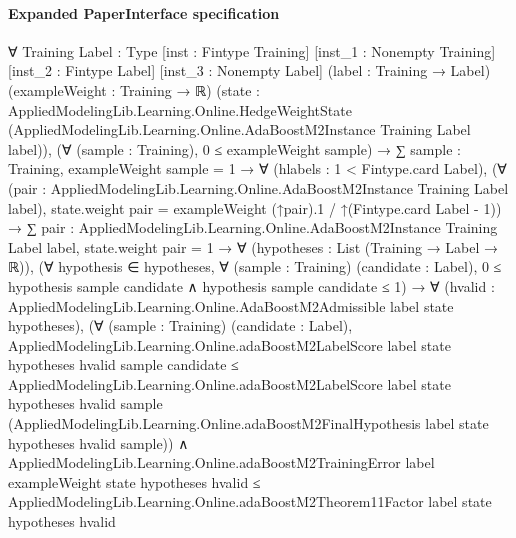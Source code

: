 \documentclass[10pt]{article}
\begin{document}
\paragraph{Expanded PaperInterface specification}
\begin{ReviewVerbatim}
∀ {Training Label : Type} [inst : Fintype Training] [inst_1 : Nonempty Training] [inst_2 : Fintype Label]
  [inst_3 : Nonempty Label] (label : Training → Label) (exampleWeight : Training → ℝ)
  (state :
    AppliedModelingLib.Learning.Online.HedgeWeightState
      (AppliedModelingLib.Learning.Online.AdaBoostM2Instance Training Label label)),
  (∀ (sample : Training), 0 ≤ exampleWeight sample) →
    ∑ sample : Training, exampleWeight sample = 1 →
      ∀ (hlabels : 1 < Fintype.card Label),
        (∀ (pair : AppliedModelingLib.Learning.Online.AdaBoostM2Instance Training Label label),
            state.weight pair = exampleWeight (↑pair).1 / ↑(Fintype.card Label - 1)) →
          ∑ pair : AppliedModelingLib.Learning.Online.AdaBoostM2Instance Training Label label, state.weight pair = 1 →
            ∀ (hypotheses : List (Training → Label → ℝ)),
              (∀ hypothesis ∈ hypotheses,
                  ∀ (sample : Training) (candidate : Label),
                    0 ≤ hypothesis sample candidate ∧ hypothesis sample candidate ≤ 1) →
                ∀ (hvalid : AppliedModelingLib.Learning.Online.AdaBoostM2Admissible label state hypotheses),
                  (∀ (sample : Training) (candidate : Label),
                      AppliedModelingLib.Learning.Online.adaBoostM2LabelScore label state hypotheses hvalid sample
                          candidate ≤
                        AppliedModelingLib.Learning.Online.adaBoostM2LabelScore label state hypotheses hvalid sample
                          (AppliedModelingLib.Learning.Online.adaBoostM2FinalHypothesis label state hypotheses hvalid
                            sample)) ∧
                    AppliedModelingLib.Learning.Online.adaBoostM2TrainingError label exampleWeight state hypotheses
                        hvalid ≤
                      AppliedModelingLib.Learning.Online.adaBoostM2Theorem11Factor label state hypotheses hvalid
\end{ReviewVerbatim}
\end{document}

